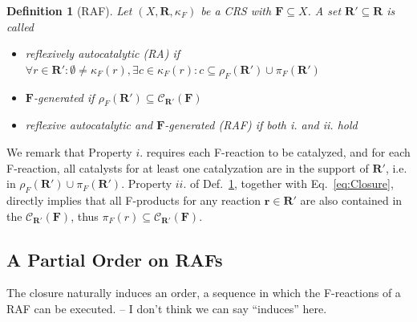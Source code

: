 \documentclass[pdflatex]{sn-jnl}
\theoremstyle{thmstyleone}%
\theoremstyle{examplesty}%
\theoremstyle{thmstylethree}%
\newtheorem{definition}[theorem]{Definition}%
\newcommand{\food}{\ensuremath{\mathbf{F}}}
\newcommand{\closure}[2]{\mathscr{C}_{#1}(#2)}
\newcommand{\FR}[0]{\mathbf{R}}
\newcommand{\fr}[0]{\mathbf{r}}
\newcommand{\RAF}[0]{\mathbf{R}'}
\newcommand{\cat}{\kappa_F}
\newcommand{\feducts}{\rho_F}
\newcommand{\fproducts}{\pi_F}
\newcommand{\TODO}[1]{\begingroup\color{red}#1\endgroup}
\begin{document}
\vspace{6pt}
\begin{definition}[RAF]\label{def:RAF}
  Let $(X,\FR,\cat)$ be a CRS with $\food\subseteq X$. A set $\RAF\subseteq
  \FR$ is called
  \vspace{6pt}
  \begin{itemize} 
  \item[i.]{\emph{reflexively autocatalytic} (RA) if $\forall r\in \RAF:
    \emptyset \neq \cat(r), \exists c\in \cat(r): c \subseteq
    \feducts(\RAF)\cup \fproducts(\RAF)$}\\[-1.0em]
  \item[ii.]{\emph{\food-generated} if $\feducts(\RAF)\subseteq
    \closure{\RAF}{\food}$}\\[-1.0em]
  \item[iii.]{\emph{reflexive autocatalytic} and \emph{\food-generated}
    (RAF) if both i. and ii. hold}
  \end{itemize}
\end{definition}
\vspace{6pt}

We remark that Property $i.$ requires each F-reaction to be catalyzed, and
for each F-reaction, all catalysts for at least one catalyzation are in the
support of $\RAF$, i.e. in $\feducts(\RAF)\cup \fproducts(\RAF)$. Property
$ii.$ of Def.~\ref{def:RAF}, together with Eq.~\ref{eq:Closure}, directly
implies that all F-products for any reaction $\fr\in \RAF$ are also
contained in the $\closure{\RAF}{\food}$, thus $\fproducts(r)\subseteq
\closure{\RAF}{\food}$.

\subsection{A Partial Order on RAFs}

\TODO{The closure naturally induces an order, a sequence in which the F-reactions
  of a RAF can be executed. -- I don't think we can say ``induces'' here. }
\end{document}
